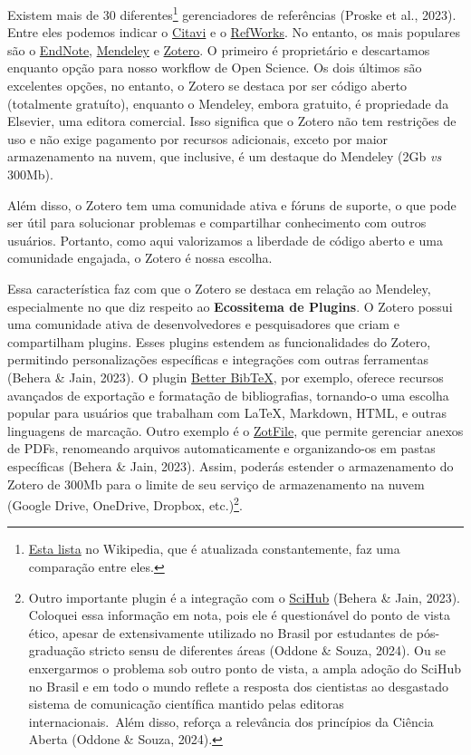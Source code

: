 \documentclass[
  a4paper,
]{book}
\begin{document}
Existem mais de 30 diferentes\footnote{\href{https://en.wikipedia.org/wiki/Comparison_of_reference_management_software}{Esta
  lista} no Wikipedia, que é atualizada constantemente, faz uma
  comparação entre eles.} gerenciadores de referências (Proske et al.,
2023). Entre eles podemos indicar o
\href{https://www.citavi.com/en}{Citavi} e o
\href{https://refworks.proquest.com/learn-more/}{RefWorks}. No entanto,
os mais populares são o \href{https://endnote.com/}{EndNote},
\href{https://www.mendeley.com/reference-management/reference-manager/}{Mendeley}
e \href{https://www.zotero.org/}{Zotero}. O primeiro é proprietário e
descartamos enquanto opção para nosso workflow de Open Science. Os dois
últimos são excelentes opções, no entanto, o Zotero se destaca por ser
código aberto (totalmente gratuíto), enquanto o Mendeley, embora
gratuito, é propriedade da Elsevier, uma editora comercial. Isso
significa que o Zotero não tem restrições de uso e não exige pagamento
por recursos adicionais, exceto por maior armazenamento na nuvem, que
inclusive, é um destaque do Mendeley (2Gb \emph{vs} 300Mb).

Além disso, o Zotero tem uma comunidade ativa e fóruns de suporte, o que
pode ser útil para solucionar problemas e compartilhar conhecimento com
outros usuários. Portanto, como aqui valorizamos a liberdade de código
aberto e uma comunidade engajada, o Zotero é nossa escolha.

Essa característica faz com que o Zotero se destaca em relação ao
Mendeley, especialmente no que diz respeito ao \textbf{Ecossitema de
Plugins}. O Zotero possui uma comunidade ativa de desenvolvedores e
pesquisadores que criam e compartilham plugins. Esses plugins estendem
as funcionalidades do Zotero, permitindo personalizações específicas e
integrações com outras ferramentas (Behera \& Jain, 2023). O plugin
\href{https://retorque.re/zotero-better-bibtex/}{Better BibTeX}, por
exemplo, oferece recursos avançados de exportação e formatação de
bibliografias, tornando-o uma escolha popular para usuários que
trabalham com LaTeX, Markdown, HTML, e outras linguagens de marcação.
Outro exemplo é o \href{https://zotfile.com/}{ZotFile}, que permite
gerenciar anexos de PDFs, renomeando arquivos automaticamente e
organizando-os em pastas específicas (Behera \& Jain, 2023). Assim,
poderás estender o armazenamento do Zotero de 300Mb para o limite de seu
serviço de armazenamento na nuvem (Google Drive, OneDrive, Dropbox,
etc.)\footnote{Outro importante plugin é a integração com o
  \href{https://github.com/ethanwillis/zotero-scihub}{SciHub} (Behera \&
  Jain, 2023). Coloquei essa informação em nota, pois ele é questionável
  do ponto de vista ético, apesar de extensivamente utilizado no Brasil
  por estudantes de pós-graduação stricto sensu de diferentes áreas
  (Oddone \& Souza, 2024). Ou se enxergarmos o problema sob outro ponto
  de vista, a ampla adoção do SciHub no Brasil e em todo o mundo reflete
  a resposta dos cientistas ao desgastado sistema de comunicação
  científica mantido pelas editoras internacionais.~Além disso, reforça
  a relevância dos princípios da Ciência Aberta (Oddone \& Souza, 2024).}.
\end{document}
